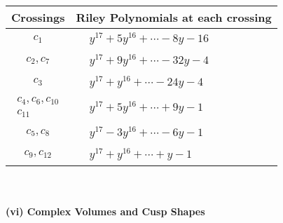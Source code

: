 \documentclass[1p]{elsarticle_modified}
\theoremstyle{definition}
\begin{document}
\begin{tabular}{m{50pt}|m{274pt}}
Crossings & \hspace{64pt}Riley Polynomials at each crossing \\
\hline $$\begin{aligned}c_{1}\end{aligned}$$&$\begin{aligned}
&y^{17}+5 y^{16}+\cdots-8 y-16
\end{aligned}$\\
\hline $$\begin{aligned}c_{2},c_{7}\end{aligned}$$&$\begin{aligned}
&y^{17}+9 y^{16}+\cdots-32 y-4
\end{aligned}$\\
\hline $$\begin{aligned}c_{3}\end{aligned}$$&$\begin{aligned}
&y^{17}+y^{16}+\cdots-24 y-4
\end{aligned}$\\
\hline $$\begin{aligned}c_{4},c_{6},c_{10}\\c_{11}\end{aligned}$$&$\begin{aligned}
&y^{17}+5 y^{16}+\cdots+9 y-1
\end{aligned}$\\
\hline $$\begin{aligned}c_{5},c_{8}\end{aligned}$$&$\begin{aligned}
&y^{17}-3 y^{16}+\cdots-6 y-1
\end{aligned}$\\
\hline $$\begin{aligned}c_{9},c_{12}\end{aligned}$$&$\begin{aligned}
&y^{17}+y^{16}+\cdots+y-1
\end{aligned}$\\
\hline
\end{tabular}\\~\\
\newpage\flushleft \textbf{(vi) Complex Volumes and Cusp Shapes}
\end{document}

